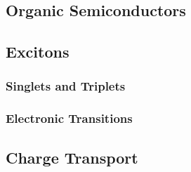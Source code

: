 \documentclass[../thesis.tex]{subfiles}
\begin{document}
\subsection{Organic Semiconductors}

\subsection{Excitons}
\subsubsection{Singlets and Triplets}
\subsubsection{Electronic Transitions}

\subsection{Charge Transport}




\end{document}
